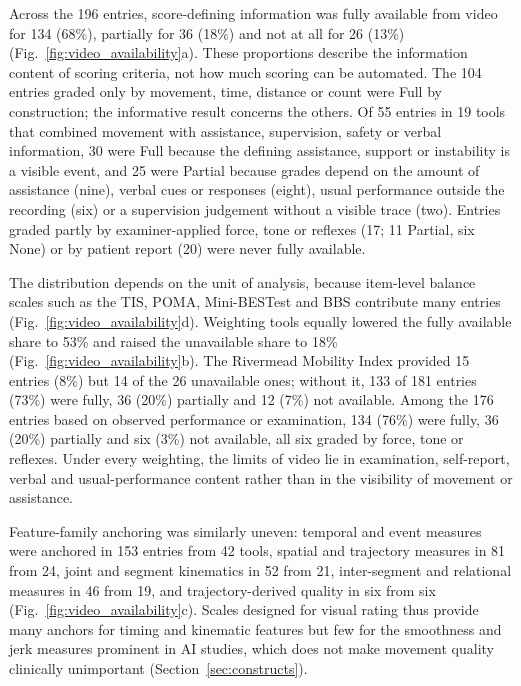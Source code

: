 \documentclass[11pt]{article}
\begin{document}


Across the 196 entries, score-defining information was fully available from video for 134 (68\%), partially for 36 (18\%) and not at all for 26 (13\%) (Fig.~\ref{fig:video_availability}a). These proportions describe the information content of scoring criteria, not how much scoring can be automated. The 104 entries graded only by movement, time, distance or count were Full by construction; the informative result concerns the others. Of 55 entries in 19 tools that combined movement with assistance, supervision, safety or verbal information, 30 were Full because the defining assistance, support or instability is a visible event, and 25 were Partial because grades depend on the amount of assistance (nine), verbal cues or responses (eight), usual performance outside the recording (six) or a supervision judgement without a visible trace (two). Entries graded partly by examiner-applied force, tone or reflexes (17; 11 Partial, six None) or by patient report (20) were never fully available.

The distribution depends on the unit of analysis, because item-level balance scales such as the TIS, POMA, Mini-BESTest and BBS contribute many entries (Fig.~\ref{fig:video_availability}d). Weighting tools equally lowered the fully available share to 53\% and raised the unavailable share to 18\% (Fig.~\ref{fig:video_availability}b). The Rivermead Mobility Index provided 15 entries (8\%) but 14 of the 26 unavailable ones; without it, 133 of 181 entries (73\%) were fully, 36 (20\%) partially and 12 (7\%) not available. Among the 176 entries based on observed performance or examination, 134 (76\%) were fully, 36 (20\%) partially and six (3\%) not available, all six graded by force, tone or reflexes. Under every weighting, the limits of video lie in examination, self-report, verbal and usual-performance content rather than in the visibility of movement or assistance.

Feature-family anchoring was similarly uneven: temporal and event measures were anchored in 153 entries from 42 tools, spatial and trajectory measures in 81 from 24, joint and segment kinematics in 52 from 21, inter-segment and relational measures in 46 from 19, and trajectory-derived quality in six from six (Fig.~\ref{fig:video_availability}c). Scales designed for visual rating thus provide many anchors for timing and kinematic features but few for the smoothness and jerk measures prominent in AI studies, which does not make movement quality clinically unimportant (Section~\ref{sec:constructs}).
\end{document}
